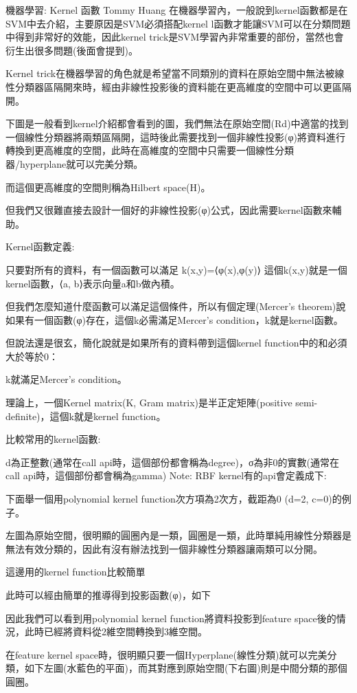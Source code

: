 \documentclass[12pt,a4paper]{amsart}
\begin{document}
機器學習: Kernel 函數
Tommy Huang
在機器學習內，一般說到kernel函數都是在SVM中去介紹，主要原因是SVM必須搭配kernel l函數才能讓SVM可以在分類問題中得到非常好的效能，因此kernel trick是SVM學習內非常重要的部份，當然也會衍生出很多問題(後面會提到)。

Kernel trick在機器學習的角色就是希望當不同類別的資料在原始空間中無法被線性分類器區隔開來時，經由非線性投影後的資料能在更高維度的空間中可以更區隔開。

下圖是一般看到kernel介紹都會看到的圖，我們無法在原始空間(Rd)中適當的找到一個線性分類器將兩類區隔開，這時後此需要找到一個非線性投影(φ)將資料進行轉換到更高維度的空間，此時在高維度的空間中只需要一個線性分類器/hyperplane就可以完美分類。


而這個更高維度的空間則稱為Hilbert space(H)。

但我們又很難直接去設計一個好的非線性投影(φ)公式，因此需要kernel函數來輔助。

Kernel函數定義:

只要對所有的資料，有一個函數可以滿足
k(x,y)=⟨φ(x),φ(y)⟩
這個k(x,y)就是一個kernel函數，⟨a, b⟩表示向量a和b做內積。

但我們怎麼知道什麼函數可以滿足這個條件，所以有個定理(Mercer’s theorem)說如果有一個函數(φ)存在，這個k必需滿足Mercer’s condition，k就是kernel函數。

但說法還是很玄，簡化說就是如果所有的資料帶到這個kernel function中的和必須大於等於0：


k就滿足Mercer’s condition。

理論上，一個Kernel matrix(K, Gram matrix)是半正定矩陣(positive semi-definite)，這個k就是kernel function。


比較常用的kernel函數:


d為正整數(通常在call api時，這個部份都會稱為degree)，σ為非0的實數(通常在call api時，這個部份都會稱為gamma)
Note: RBF kernel有的api會定義成下:


下面舉一個用polynomial kernel function次方項為2次方，截距為0 (d=2, c=0)的例子。

左圖為原始空間，很明顯的圓圈內是一類，圓圈是一類，此時單純用線性分類器是無法有效分類的，因此有沒有辦法找到一個非線性分類器讓兩類可以分開。


這邊用的kernel function比較簡單


此時可以經由簡單的推導得到投影函數(φ)，如下


因此我們可以看到用polynomial kernel function將資料投影到feature space後的情況，此時已經將資料從2維空間轉換到3維空間。


在feature kernel space時，很明顯只要一個Hyperplane(線性分類)就可以完美分類，如下左圖(水藍色的平面)，而其對應到原始空間(下右圖)則是中間分類的那個圓圈。
\end{document}
